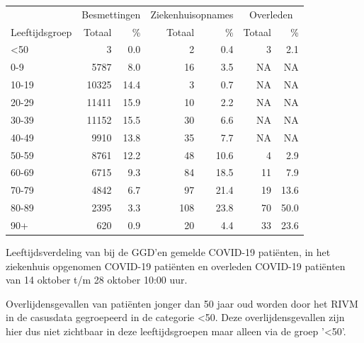 \documentclass[
  english,
  man,floatsintext]{apa6}
\begin{document}
\begin{table}
\centering\begingroup\fontsize{11}{13}\selectfont

\begin{threeparttable}
\begin{tabular}{lrrrrrr}
\toprule
\multicolumn{1}{c}{ } & \multicolumn{2}{c}{Besmettingen} & \multicolumn{2}{c}{Ziekenhuisopnames} & \multicolumn{2}{c}{Overleden} \\
\cmidrule(l{3pt}r{3pt}){2-3} \cmidrule(l{3pt}r{3pt}){4-5} \cmidrule(l{3pt}r{3pt}){6-7}
Leeftijdsgroep & Totaal & \% & Totaal & \% & Totaal & \%\\
\midrule
<50 & 3 & 0.0 & 2 & 0.4 & 3 & 2.1\\
0-9 & 5787 & 8.0 & 16 & 3.5 & NA & NA\\
10-19 & 10325 & 14.4 & 3 & 0.7 & NA & NA\\
20-29 & 11411 & 15.9 & 10 & 2.2 & NA & NA\\
30-39 & 11152 & 15.5 & 30 & 6.6 & NA & NA\\
40-49 & 9910 & 13.8 & 35 & 7.7 & NA & NA\\
50-59 & 8761 & 12.2 & 48 & 10.6 & 4 & 2.9\\
60-69 & 6715 & 9.3 & 84 & 18.5 & 11 & 7.9\\
70-79 & 4842 & 6.7 & 97 & 21.4 & 19 & 13.6\\
80-89 & 2395 & 3.3 & 108 & 23.8 & 70 & 50.0\\
90+ & 620 & 0.9 & 20 & 4.4 & 33 & 23.6\\
\bottomrule
\end{tabular}
\begin{tablenotes}
\item[1] Leeftijdsverdeling van bij de GGD’en gemelde COVID-19 patiënten, in het ziekenhuis opgenomen COVID-19 patiënten en overleden COVID-19 patiënten van 14 oktober t/m 28 oktober 10:00 uur.
\item[2] Overlijdensgevallen van patiënten jonger dan 50 jaar oud worden door het RIVM in de casusdata gegroepeerd in de categorie <50. Deze overlijdensgevallen zijn hier dus niet zichtbaar in deze leeftijdsgroepen maar alleen via de groep '<50'.
\end{tablenotes}
\end{threeparttable}
\endgroup{}
\end{table}

\newpage
\end{document}
